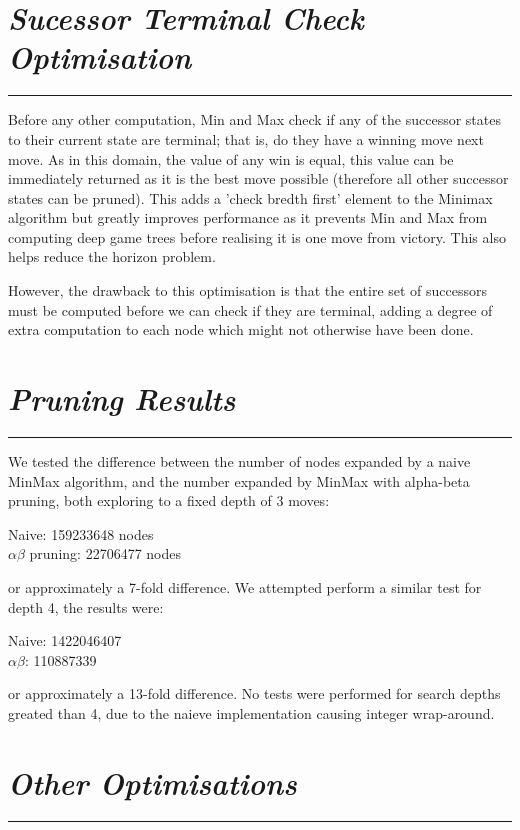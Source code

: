 \documentclass[10pt]{report}
\begin{document}
\begin{multicols}{2}
\section*{\emph{\textmd{Sucessor Terminal Check Optimisation}}}
\hrule
\vspace{0.4cm}

Before any other computation, Min and Max check if any of the successor states to their current state are terminal; that is, do they have a winning move next move. As in this domain, the value of any win is equal, this value can be immediately returned as it is the best move possible (therefore all other successor states can be pruned). This adds a 'check bredth first' element to the Minimax algorithm but greatly improves performance as it prevents Min and Max from computing deep game trees before realising it is one move from victory. This also helps reduce the horizon problem.

However, the drawback to this optimisation is that the entire set of successors must be computed before we can check if they are terminal, adding a degree of extra computation to each node which might not otherwise have been done.

\section*{\emph{\textmd{Pruning Results}}}
\hrule
\vspace{0.4cm}

We tested the difference between the number of nodes expanded by a naive MinMax algorithm, and the number expanded by MinMax with alpha-beta pruning, both exploring to a fixed depth of 3 moves:

Naive: 159233648 nodes \\
$\alpha\beta$ pruning: 22706477 nodes

or approximately a 7-fold difference. We attempted perform a similar test for depth 4, the results were:

Naive:  1422046407 \\
$\alpha\beta$:  110887339

or approximately a 13-fold difference. No tests were performed for search depths greated than 4, due to the naieve implementation causing integer wrap-around.

\section*{\emph{{Other Optimisations}}}
\hrule
\vspace{0.4cm}


\end{multicols}
\end{document}
